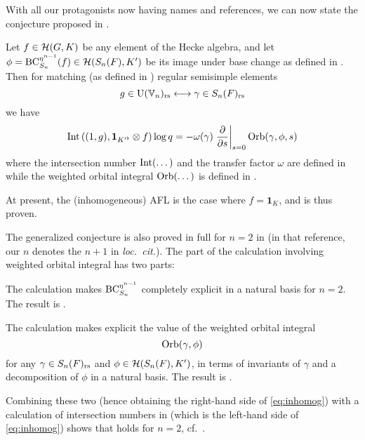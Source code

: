 With all our protagonists now having names and references,
we can now state the conjecture proposed in \cite{ref:AFLspherical}.
\begin{conjecture}
  \label{conj:inhomog}
  Let $f \in \mathcal H(G, K)$ be any element of the Hecke algebra,
  and let $\phi = \operatorname{BC}_{S_n}^{\eta^{n-1}}(f) \in \mathcal H(S_n(F), K')$ be its image
  under base change as defined in .
  Then for matching (as defined in ) regular semisimple elements
  \[ g \in \operatorname{U}(\mathbb V_n)_{\mathrm{rs}} \longleftrightarrow \gamma \in S_n(F)_{\mathrm{rs}} \]
  we have
  \begin{equation}
    \operatorname{Int}\left( (1,g), \mathbf{1}_{K'^\flat} \otimes f \right) \log q
    = -\omega(\gamma) \left. \pdv{}{s} \right\rvert_{s=0} \operatorname{Orb}(\gamma, \phi, s)
    \label{eq:inhomog}
  \end{equation}
  where the intersection number $\operatorname{Int}(\dots)$ and
  the transfer factor $\omega$ are defined in 
  while the weighted orbital integral $\operatorname{Orb}(\dots)$ is defined in .
\end{conjecture}

At present, the (inhomogeneous) AFL is the case where $f = \mathbf{1}_K$,
and is thus proven.

The generalized conjecture is also proved in full for
$n = 2$ in \cite[Theorem 1.0.1]{ref:AFLspherical}
(in that reference, our $n$ denotes the $n+1$ in \emph{loc.\ cit.}).
The part of the calculation involving weighted orbital integral has two parts:
\begin{itemize}
  \ii The calculation makes $\operatorname{BC}_{S_{n}}^{\eta^{n-1}}$
  completely explicit in a natural basis for $n = 2$.
  The result is \cite[Lemma 7.1.1]{ref:AFLspherical}.

  \ii The calculation makes explicit the value of the weighted orbital integral
  \[ \operatorname{Orb}(\gamma, \phi) \]
  for any $\gamma \in S_n(F)_{\mathrm{rs}}$ and $\phi \in \mathcal H(S_n(F), K')$,
  in terms of invariants of $\gamma$ and a decomposition of $\phi$ in a natural basis.
  The result is \cite[Proposition 7.3.2]{ref:AFLspherical}.
\end{itemize}
Combining these two (hence obtaining the right-hand side of \eqref{eq:inhomog})
with a calculation of intersection numbers in \cite[Corollary 7.4.3]{ref:AFLspherical}
(which is the left-hand side of \eqref{eq:inhomog})
shows that  holds for $n = 2$,
cf.\ \cite[Theorem 7.5.1]{ref:AFLspherical}.

